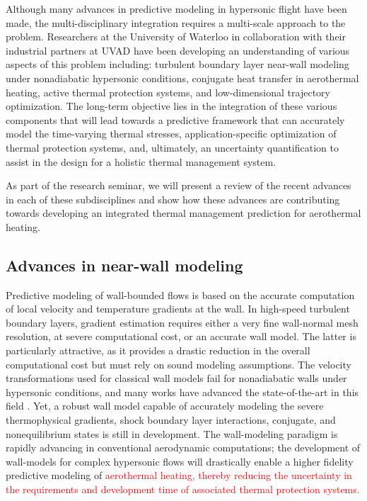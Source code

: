 \documentclass [11pt, fancyhdr, twoside] {article}
\newcommand{\rw}{\textcolor{red}}
\begin{document}
Although many advances in predictive modeling in hypersonic flight have been made, the multi-disciplinary integration requires a multi-scale approach to the problem. Researchers at the University of Waterloo in collaboration with their industrial partners at UVAD have been developing an understanding of various aspects of this problem including: turbulent boundary layer near-wall modeling under nonadiabatic hypersonic conditions, conjugate heat transfer in aerothermal heating, active thermal protection systems, and low-dimensional trajectory optimization. The long-term objective lies in the integration of these various components that will lead towards a  predictive framework that can accurately model the time-varying thermal stresses, application-specific optimization of thermal protection systems, and, ultimately, an uncertainty quantification  to assist in the design for a holistic thermal management system.


As part of the research seminar, we will present a review of the recent advances in each of these subdisciplines and show how these advances are contributing towards developing an integrated thermal management prediction for aerothermal heating.



\subsection{Advances in near-wall modeling}
Predictive modeling of wall-bounded flows is based on the accurate computation of local velocity and temperature gradients at the wall. In high-speed turbulent boundary layers, gradient estimation requires either a very fine wall-normal mesh resolution, at severe computational cost, or an accurate wall model. The latter is particularly attractive, as it provides a drastic reduction in the overall computational cost but must rely on sound modeling assumptions. The velocity transformations used for classical wall models fail for nonadiabatic walls under hypersonic conditions, and many works have advanced the state-of-the-art in this field \citep{Griffin_Fu_Moin_2021,Younes_2021,Younes_Hickey_2023}. Yet, a robust wall model capable of accurately modeling the severe thermophysical gradients, shock boundary layer interactions, conjugate, and nonequilibrium states is still in development. The wall-modeling paradigm is rapidly advancing in conventional aerodynamic computations; the development of wall-models for complex hypersonic flows will drastically enable a higher fidelity predictive modeling of \rw{aerothermal heating, thereby reducing the uncertainty in the requirements and development time of associated thermal protection systems.} 
\end{document}
